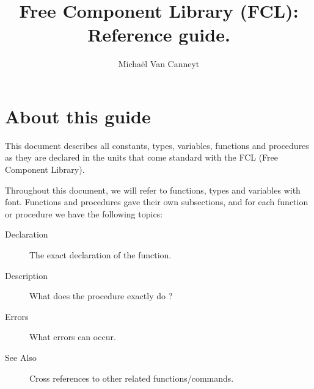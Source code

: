 %
%
%
%
%

\ifpdf
\fi
%
%
\makeindex
\usepackage{tabularx}
%
%

\title{Free Component Library (FCL): \\ Reference guide.}
\label{rtl}

\author{Micha\"el Van Canneyt}
\maketitle
\tableofcontents
\newpage

\section*{About this guide}
This document describes all constants, types, variables, functions and
procedures as they are declared in the units that come standard with the 
FCL (Free Component Library).

Throughout this document, we will refer to functions, types and variables
with  font. Functions and procedures gave their own
subsections, and for each function or procedure we have the following
topics:
\begin{description}
\item [Declaration] The exact declaration of the function.
\item [Description] What does the procedure exactly do ?
\item [Errors] What errors can occur.
\item [See Also] Cross references to other related functions/commands.
\end{description}



